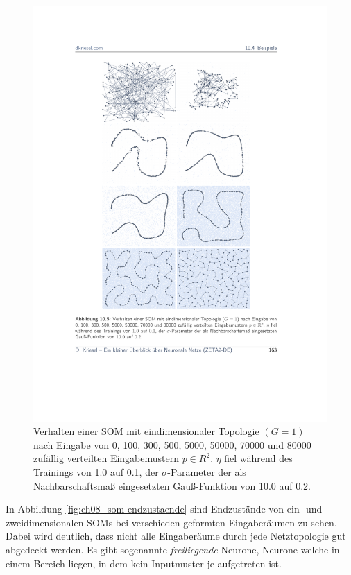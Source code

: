 \begin{figure}[ht!] \centering 
	\includegraphics[width=\linewidth]{figures/ch08_som-entwicklung.pdf}
	\caption{Verhalten einer SOM mit eindimensionaler Topologie $(G = 1)$ nach Eingabe von 0, 100, 300, 500, 5000, 50000, 70000 und 80000 zufällig verteilten Eingabemustern $p \in R^2$. $\eta$ fiel während des Trainings von 1.0 auf 0.1, der $\sigma$-Parameter der als Nachbarschaftsmaß eingesetzten Gauß-Funktion von 10.0 auf 0.2.}
	\label{fig:ch08_som-entwicklung}
\end{figure}

In Abbildung \ref{fig:ch08_som-endzustaende} sind Endzustände von ein- und zweidimensionalen SOMs bei verschieden geformten Eingaberäumen zu sehen. Dabei wird deutlich, dass nicht alle Eingaberäume durch jede Netztopologie gut abgedeckt werden. Es gibt sogenannte \emph{freiliegende} Neurone, Neurone welche in einem Bereich liegen, in dem kein Inputmuster je aufgetreten ist.

